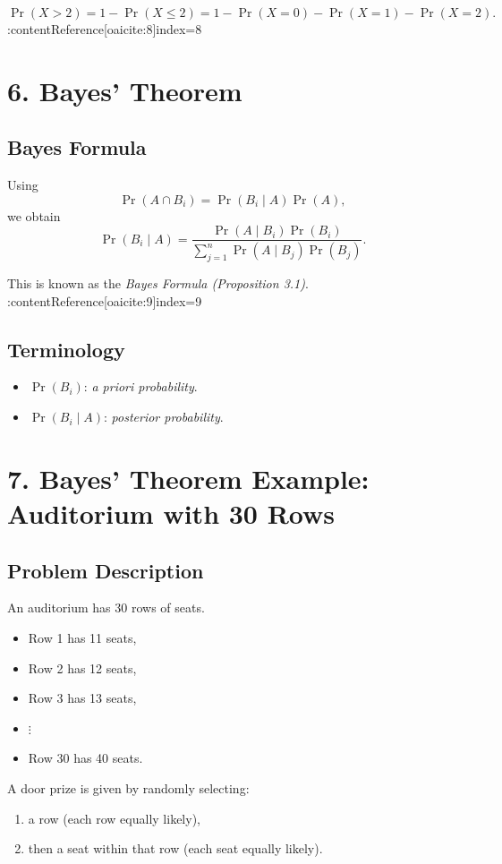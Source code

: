 \documentclass[11pt]{article}
\begin{document}
\[
\Pr(X > 2) = 1 - \Pr(X \le 2)
= 1 - \Pr(X=0) - \Pr(X=1) - \Pr(X=2).
\] 
:contentReference[oaicite:8]{index=8}

\section*{6. Bayes' Theorem}

\subsection*{Bayes Formula}
Using
\[
\Pr(A \cap B_i) = \Pr(B_i \mid A)\Pr(A),
\]
we obtain
\[
\Pr(B_i \mid A) = \frac{\Pr(A \mid B_i)\Pr(B_i)}{\sum_{j=1}^{n} \Pr(A \mid B_j)\Pr(B_j)}.
\]

This is known as the \emph{Bayes Formula (Proposition 3.1)}. :contentReference[oaicite:9]{index=9}

\subsection*{Terminology}
\begin{itemize}
\item $\Pr(B_i)$: \emph{a priori probability}.
\item $\Pr(B_i \mid A)$: \emph{posterior probability}.
\end{itemize}

\section*{7. Bayes' Theorem Example: Auditorium with 30 Rows}

\subsection*{Problem Description}
An auditorium has 30 rows of seats.
\begin{itemize}
\item Row 1 has 11 seats,
\item Row 2 has 12 seats,
\item Row 3 has 13 seats,
\item $\vdots$
\item Row 30 has 40 seats.
\end{itemize}

A door prize is given by randomly selecting:
\begin{enumerate}
\item a row (each row equally likely),
\item then a seat within that row (each seat equally likely).
\end{enumerate}
\end{document}

